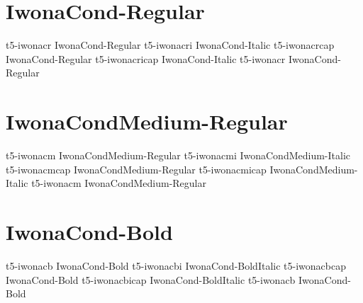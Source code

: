 \documentclass[sample]{vnsample}
\begin{document}
\section{IwonaCond-Regular}
     {t5-iwonacr}     {IwonaCond-Regular}
    {t5-iwonacri}    {IwonaCond-Italic}
    {t5-iwonacrcap}  {IwonaCond-Regular}
  {t5-iwonacricap} {IwonaCond-Italic}
     {t5-iwonacr}     {IwonaCond-Regular}

\section{IwonaCondMedium-Regular}
    {t5-iwonacm}     {IwonaCondMedium-Regular}
   {t5-iwonacmi}    {IwonaCondMedium-Italic}
   {t5-iwonacmcap}  {IwonaCondMedium-Regular}
 {t5-iwonacmicap} {IwonaCondMedium-Italic}
    {t5-iwonacm}     {IwonaCondMedium-Regular}

\section{IwonaCond-Bold}
     {t5-iwonacb}     {IwonaCond-Bold}
    {t5-iwonacbi}    {IwonaCond-BoldItalic}
    {t5-iwonacbcap}  {IwonaCond-Bold}
  {t5-iwonacbicap} {IwonaCond-BoldItalic}
     {t5-iwonacb}     {IwonaCond-Bold}
\end{document}
